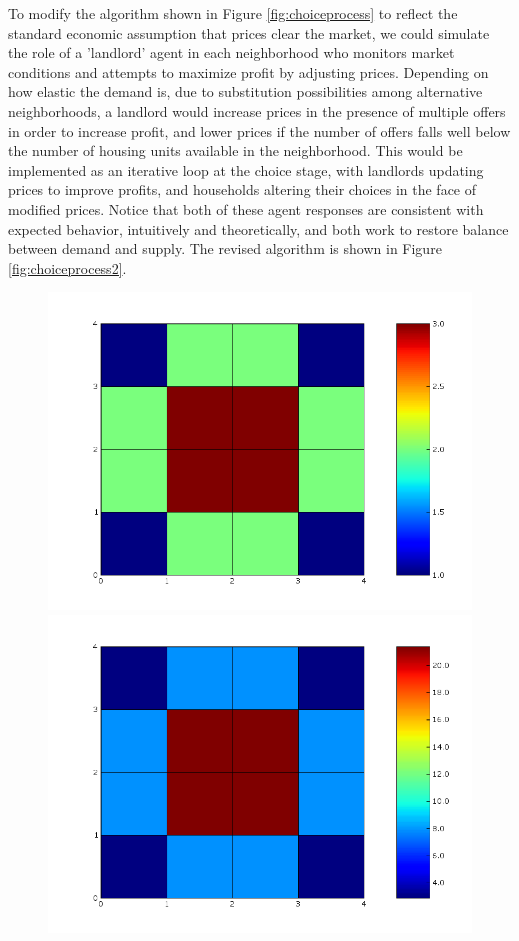 \documentclass[12pt,a4paper]{article}
\begin{document}
To modify the algorithm shown in Figure \ref{fig:choiceprocess} to
reflect the standard economic assumption that prices clear the
market, we could simulate the role of a 'landlord' agent in each
neighborhood who monitors market conditions and attempts to
maximize profit by adjusting prices. Depending on how elastic the
demand is, due to substitution possibilities among alternative
neighborhoods, a landlord would increase prices in the presence of
multiple offers in order to increase profit, and lower prices if
the number of offers falls well below the number of housing units
available in the neighborhood.  This would be implemented as an
iterative loop at the choice stage, with landlords updating prices
to improve profits, and households altering their choices in the
face of modified prices.  Notice that both of these agent
responses are consistent with expected behavior, intuitively and
theoretically, and both work to restore balance between demand and
supply.  The revised algorithm is shown in Figure
\ref{fig:choiceprocess2}.


\begin{figure}[h]
\centerline{
 \includegraphics[width=.25\textwidth,height=0.2\textwidth]
 {example_grid_util.png} \hspace{1cm}
 \includegraphics[width=.25\textwidth,height=0.2\textwidth]
 {example_grid_prob.png}}
\end{figure}
\end{document}
